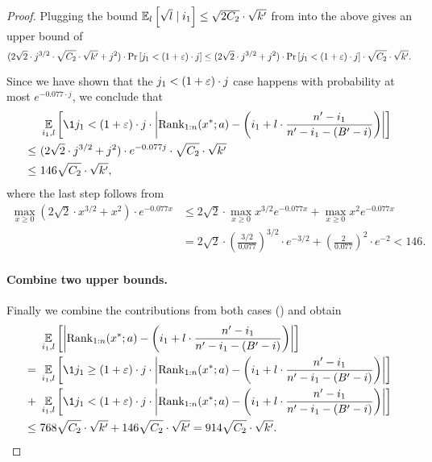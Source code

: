 \begin{proof}
Plugging the bound $\operatorname*{\mathbb{E}}_{l}\left[\sqrt{l} \mid i_1\right] \le \sqrt{2C_2}\cdot\sqrt{k'}$ from  into the above gives an upper bound of
\[
    (2\sqrt{2}\cdot j^{3/2}\cdot\sqrt{C_2}\cdot\sqrt{k'} + j^2)\cdot \Pr_{}\left[j_1 < (1 + \varepsilon)\cdot j\right]
\le (2\sqrt{2}\cdot j^{3/2} + j^2)\cdot \Pr_{}\left[j_1 < (1 + \varepsilon)\cdot j\right]\cdot \sqrt{C_2}\cdot\sqrt{k'}.
\]
Since we have shown that the $j_1 < (1 + \varepsilon)\cdot j$ case happens with probability at most $e^{-0.077\cdot j}$, we conclude that
\begin{equation}\begin{split}\label{upper-bound.2}
    &~\Ex{i_1, l}{\1{j_1 < (1+\eps)\cdot j}\cdot\left|\rank_{{1:n}}(x^*; a) - \left(i_1+l\cdot \frac{n'-i_1}{n'-i_1-(B'-i)}\right)\right|}\\
\le &~(2\sqrt{2}\cdot j^{3/2} + j^2)\cdot e^{-0.077j}\cdot\sqrt{C_2}\cdot\sqrt{k'}\\
\le &~ 146\sqrt{C_2}\cdot\sqrt{k'},
\end{split}\end{equation}
where the last step follows from
\begin{align*}
    \max_{x \ge 0}\left(2\sqrt{2}\cdot x^{3/2} + x^2\right)\cdot e^{-0.077x}
&\le 2\sqrt{2}\cdot\max_{x\ge0}x^{3/2}e^{-0.077x} + \max_{x\ge0}x^2e^{-0.077x}\\
&=  2\sqrt{2}\cdot \left(\frac{3/2}{0.077}\right)^{3/2}\cdot e^{-3/2} + \left(\frac{2}{0.077}\right)^{2}\cdot e^{-2}
<   146.
\end{align*}

\paragraph{Combine two upper bounds.}
Finally we combine the contributions from both cases () and obtain
\begin{align*}
    &~\Ex{i_1, l}{\left|\rank_{{1:n}}(x^*; a) - \left(i_1+l\cdot \frac{n'-i_1}{n'-i_1-(B'-i)}\right)\right|}\\
=   &~\Ex{i_1, l}{\1{j_1 \ge (1+\eps)\cdot j}\cdot\left|\rank_{{1:n}}(x^*; a) - \left(i_1+l\cdot \frac{n'-i_1}{n'-i_1-(B'-i)}\right)\right|}\\
+   &~\Ex{i_1, l}{\1{j_1 < (1+\eps)\cdot j}\cdot\left|\rank_{{1:n}}(x^*; a) - \left(i_1+l\cdot \frac{n'-i_1}{n'-i_1-(B'-i)}\right)\right|}\\
\le &~768\sqrt{C_2}\cdot\sqrt{k'} + 146\sqrt{C_2}\cdot\sqrt{k'}
=   914\sqrt{C_2}\cdot\sqrt{k'}.
\end{align*}
\end{proof}


